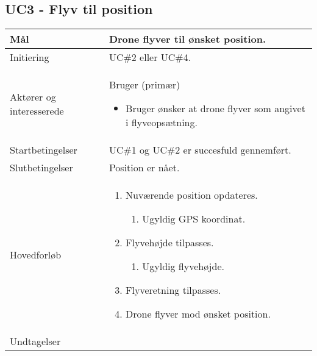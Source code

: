 \subsection*{UC3 - Flyv til position}

\begin{table}[H]
\begin{tabular}{| p{3cm}| p{11.5cm}|}
\hline


Mål	 							& Drone flyver til ønsket position. \\\hline
Initiering 							& UC\#2 eller UC\#4. \\\hline
Aktører og interesserede			& Bruger (primær) 

										\begin{itemize}
											\item Bruger ønsker at drone flyver som angivet i flyveopsætning.
										\end{itemize} \\\hline
Startbetingelser							& UC\#1 og UC\#2 er succesfuld gennemført. \\\hline
Slutbetingelser						& Position er nået. \\\hline
Hovedforløb				&
 
									\renewcommand{\labelenumi}{\arabic{enumi}.}
									\renewcommand{\labelenumii}{\Roman{enumii}:}

									\begin{enumerate}[topsep=0.0cm, leftmargin=0.5cm]
										\item Nuværende position opdateres.
											\begin{enumerate}[partopsep=4cm, topsep=0cm, leftmargin=1cm]
												\item Ugyldig GPS koordinat.
											\end{enumerate}
										\item Flyvehøjde tilpasses.
											\begin{enumerate}[partopsep=4cm, topsep=0cm, leftmargin=1cm]
												\item Ugyldig flyvehøjde.
											\end{enumerate}
										\item Flyveretning tilpasses.
										\item Drone flyver mod ønsket position.
									\end{enumerate} \\\hline	

Undtagelser							& 


\end{tabular}
\end{table}
